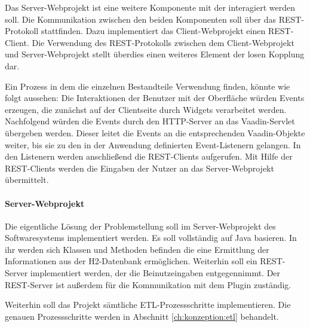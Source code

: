Das Server-Webprojekt ist eine weitere Komponente mit der interagiert werden soll. Die Kommunikation zwischen den beiden Komponenten soll über das REST-Protokoll stattfinden. Dazu implementiert das Client-Webprojekt einen REST-Client. Die Verwendung des REST-Protokolls zwischen dem Client-Webprojekt und Server-Webprojekt stellt überdies einen weiteres Element der losen Kopplung dar.

Ein Prozess in dem die einzelnen Bestandteile Verwendung finden, könnte wie folgt aussehen: Die Interaktionen der Benutzer mit der Oberfläche würden Events erzeugen, die zunächst auf der Clientseite durch Widgets verarbeitet werden. Nachfolgend würden die Events durch den HTTP-Server an das Vaadin-Servlet übergeben werden. Dieser leitet die Events an die entsprechenden Vaadin-Objekte weiter, bis sie zu den in der Anwendung definierten Event-Listenern gelangen. In den Listenern werden anschließend die REST-Clients aufgerufen. Mit Hilfe der REST-Clients werden die Eingaben der Nutzer an das Server-Webprojekt übermittelt. 

\paragraph{Server-Webprojekt}

Die eigentliche Lösung der Problemstellung soll im Server-Webprojekt des Softwaresystems implementiert werden. Es soll vollständig auf Java basieren. In ihr werden sich Klassen und Methoden befinden die eine Ermittlung der Informationen aus der H2-Datenbank ermöglichen. Weiterhin soll ein REST-Server implementiert werden, der die Beinutzeingaben entgegennimmt. Der REST-Server ist außerdem für die Kommunikation mit dem Plugin zuständig.

Weiterhin soll das Projekt sämtliche ETL-Prozessschritte implementieren. Die genauen Prozessschritte werden in Abschnitt \ref{ch:konzeption:etl} behandelt. 



